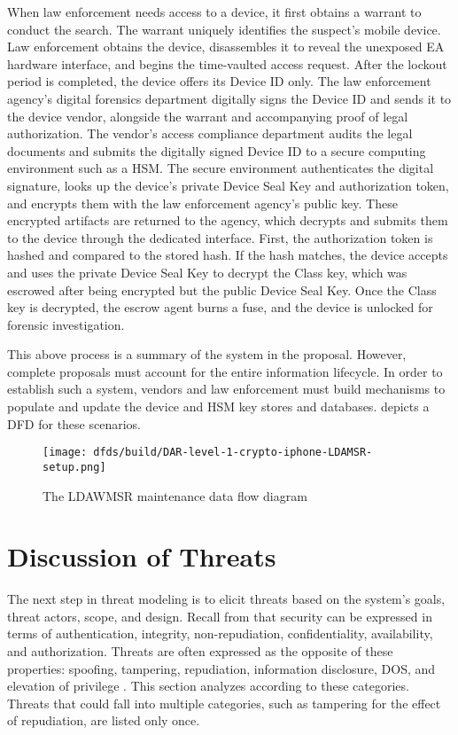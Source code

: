 When law enforcement needs access to a device, it first obtains a warrant to conduct the search. The warrant uniquely
identifies the suspect's mobile device. Law enforcement obtains the device, disassembles it to reveal the unexposed
\ac{EA} hardware interface, and begins the time-vaulted access request. After the lockout period is completed, the
device offers its Device ID only. The law enforcement agency's digital forensics department digitally signs the Device
ID and sends it to the device vendor, alongside the warrant and accompanying proof of legal authorization. The vendor's
access compliance department audits the legal documents and submits the digitally signed Device ID to a secure computing
environment such as a \ac{HSM}. The secure environment authenticates the digital signature, looks up the device's
private Device Seal Key and authorization token, and encrypts them with the law enforcement agency's public key. These
encrypted artifacts are returned to the agency, which decrypts and submits them to the device through the dedicated
interface. First, the authorization token is hashed and compared to the stored hash. If the hash matches, the device
accepts and uses the private Device Seal Key to decrypt the Class key, which was escrowed after being encrypted but the
public Device Seal Key. Once the Class key is decrypted, the escrow agent burns a fuse, and the device is unlocked for
forensic investigation.

This above process is a summary of the system in the \ldawmsr proposal. However, complete proposals must account for the
entire information lifecycle. In order to establish such a system, vendors and law enforcement must build mechanisms to
populate and update the device and \ac{HSM} key stores and databases.  depicts a \ac{DFD}
for these scenarios.

\begin{figure}[H]
  \centering\CaptionFontSize
  \texttt{[image: dfds/build/DAR-level-1-crypto-iphone-LDAMSR-setup.png]}
  \caption{The LDAWMSR maintenance data flow diagram}
  \label{fig-dfd-ldawmsr-setup}
\end{figure}


\section{Discussion of Threats}
\label{sec-prop-threats}

The next step in threat modeling is to elicit threats based on the system's goals, threat actors, scope, and design.
Recall from  that security can be expressed in terms of authentication, integrity,
non-repudiation, confidentiality, availability, and authorization. Threats are often expressed as the opposite of these
properties: spoofing, tampering, repudiation, information disclosure, \acl{DOS}, and elevation of privilege
\cite{shostack_threat_2014}. This section analyzes \ldawmsr according to these categories. Threats that could fall into
multiple categories, such as tampering for the effect of repudiation, are listed only once.

